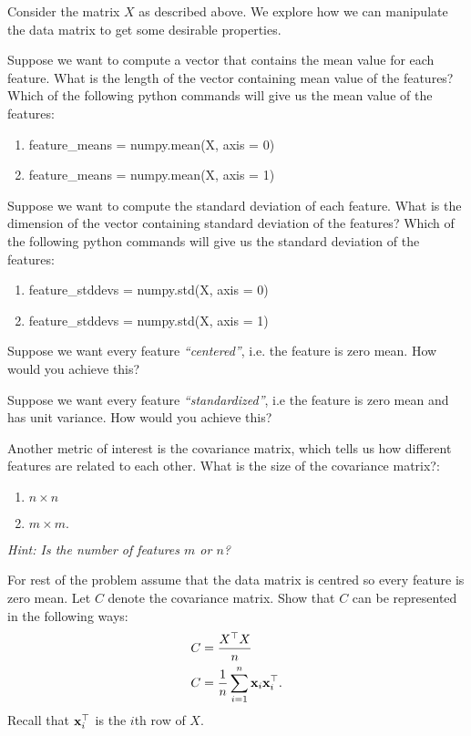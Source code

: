 Consider the matrix $X$ as described above. We explore how we can manipulate the data matrix to get some desirable properties. 
\begin{enumerate}
\qitem Suppose we want to compute a vector that contains the mean value for each feature. What is the length of the vector containing mean value of the features?  Which of the following python commands will give us the mean value of the features:
\begin{enumerate}
    \item feature\_means = numpy.mean(X, axis = 0)
    \item feature\_means = numpy.mean(X, axis = 1)
\end{enumerate}
\sol{ 

}

\qitem Suppose we want to compute the standard deviation of each feature. What is the dimension of the vector containing standard deviation of the features? Which of the following python commands will give us the standard deviation of the features:
\begin{enumerate}
    \item feature\_stddevs = numpy.std(X, axis = 0)
    \item feature\_stddevs = numpy.std(X, axis = 1)
\end{enumerate} 
\sol{ 

}
\qitem Suppose we want every feature \emph{``centered''}, i.e. the feature is zero mean. How would you achieve this?

\sol{

}
\qitem Suppose we want every feature \emph{``standardized''}, i.e the feature is zero mean and has unit variance. How would you achieve this?

\sol{\\

}

\qitem Another metric of interest is the covariance matrix, which tells us how different features are related to each other. What is the size of the covariance matrix?:
\begin{enumerate}
    \item $n \times n$
    \item $m \times m.$
\end{enumerate}
\emph{Hint: Is the number of features $m$ or $n$?}

\sol{

}
\qitem For rest of the problem assume that the data matrix is centred so every feature is zero mean. Let $C$ denote the covariance matrix. Show that $C$ can be represented in the following ways:
\begin{align*}
    C &= \frac{X^{\top} X}{n} \\
    C &= \frac{1}{n}\sum\limits_{i=1}^n \mathbf{x}_i \mathbf{x}_i^{\top}.
\end{align*}
Recall that $\mathbf{x}_i^{\top}$ is the $i$th row of $X$.


\end{enumerate}
